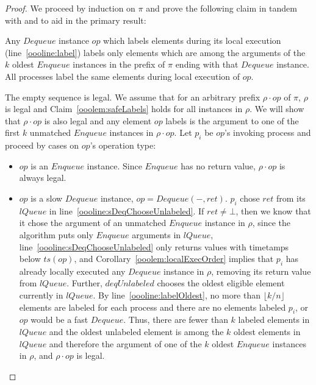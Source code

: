 \documentclass[a4paper,anonymous,USenglish]{lipics-v2021}
\theoremstyle{definition}
\begin{document}
\begin{proof}
  We proceed by induction on $\pi$ and prove the following claim in tandem with and to aid in the primary result:

  \begin{claim}\label{ooolem:safeLabels}
    Any $Dequeue$ instance $op$ which labels elements during its local execution (line~\ref{oooline:label}) labels only elements which are among the arguments of the $k$ oldest $Enqueue$ instances in the prefix of $\pi$ ending with that $Dequeue$ instance.  All processes label the same elements during local execution of $op$.
  \end{claim}

  The empty sequence is legal.  We assume that for an arbitrary prefix $\rho \cdot op$ of $\pi$, $\rho$ is legal and Claim~\ref{ooolem:safeLabels} holds for all instances in $\rho$.  We will show that $\rho \cdot op$ is also legal and any element $op$ labels is the argument to one of the first $k$ unmatched $Enqueue$ instances in $\rho \cdot op$.  Let $p_i$ be $op$'s invoking process and proceed by cases on $op$'s operation type:
  \begin{itemize}
  \item $op$ is an $Enqueue$ instance.  Since $Enqueue$ has no return value, $\rho \cdot op$ is always legal.
%
  \item $op$ is a slow $Dequeue$ instance, $op = Dequeue(-,ret)$.  $p_i$ chose $ret$ from its $lQueue$ in line~\ref{oooline:sDeqChooseUnlabeled}.  %
%
    If $ret \neq \bot$, then we know that it chose the argument of an unmatched $Enqueue$ instance in $\rho$, since the algorithm puts only $Enqueue$ arguments in $lQueue$, line~\ref{oooline:sDeqChooseUnlabeled} only returns values with timetamps below $ts(op)$, and Corollary~\ref{ooolem:localExecOrder} implies that $p_i$ has already locally executed any $Dequeue$ instance in $\rho$, removing its return value from $lQueue$.  Further, $deqUnlabeled$ chooses the oldest eligible element currently in $lQueue$.  By line~\ref{oooline:labelOldest}, no more than $\lfloor k/n\rfloor$ elements are labeled for each process and there are no elements labeled $p_i$, or $op$ would be a fast $Dequeue$.  Thus, there are fewer than $k$ labeled elements in $lQueue$ and the oldest unlabeled element is among the $k$ oldest elements in $lQueue$ and therefore the argument of one of the $k$ oldest $Enqueue$ instances in $\rho$, and $\rho \cdot op$ is legal.


\end{itemize}
\end{proof}
\end{document}
